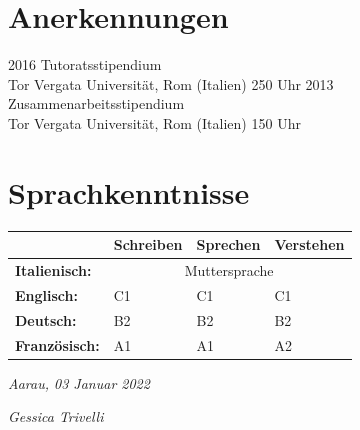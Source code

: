 \documentclass[11pt]{friggeri-cv}
\begin{document}
\section{Anerkennungen}
\begin{entrylist}
  \entry
    {2016}
    {Tutoratsstipendium}
    {\\Tor Vergata Universit\"{a}t, Rom (Italien)}
    {250 Uhr}
  \entry
    {2013}
    {Zusammenarbeitsstipendium}
    {\\Tor Vergata Universit\"{a}t, Rom (Italien)}
    {150 Uhr}
\end{entrylist}


\section{Sprachkenntnisse}
\begin{table}[!h]
  \centering
  \renewcommand{\arraystretch}{1.45}
  \begin{tabular}{ p{3cm} p{3cm} p{3cm} p{3cm} }
    \hline
    & \textbf{Schreiben}       & \textbf{Sprechen} & \textbf{Verstehen}  \\     \hline
    \textbf{Italienisch:}      & \multicolumn{3}{c}{Muttersprache}       \\
    \textbf{Englisch:}         & C1 & C1 & C1                            \\ 
    \textbf{Deutsch:}          & B2 & B2 & B2                            \\ 
    \textbf{Franz\"{o}sisch:}  & A1 & A1 & A2                            \\    \hline
  \end{tabular}
\end{table}



\vspace{100pt}
\begin{flushleft}
\large\emph{Aarau, 03 Januar 2022}
\end{flushleft}
\begin{flushright}
\large\emph{Gessica Trivelli}
\end{flushright}
\end{document}
